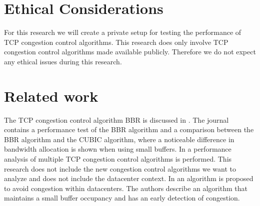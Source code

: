 \documentclass{article}
\begin{document}
\section{Ethical Considerations}

For this research we will create a private setup for testing the performance of
TCP congestion control algorithms. This research does only involve TCP
congestion control algorithms made available publicly. Therefore we do not
expect any ethical issues during this research.


\section{Related work}

The TCP congestion control algorithm BBR is discussed in \cite{bbr-congestion}.
The journal contains a performance test of the BBR algorithm and a comparison
between the BBR algorithm and the CUBIC algorithm, where a noticeable
difference in bandwidth allocation is shown when using small buffers. In
\cite{multiple-congestion} a performance analysis of multiple TCP congestion
control algorithms is performed. This research does not include the new
congestion control algorithms we want to analyze and does not include the
datacenter context. In \cite{dctcp-congestion-original} an algorithm is
proposed to avoid congestion within datacenters. The authors describe an
algorithm that maintains a small buffer occupancy and has an early detection of
congestion.

\printbibliography
\end{document}
